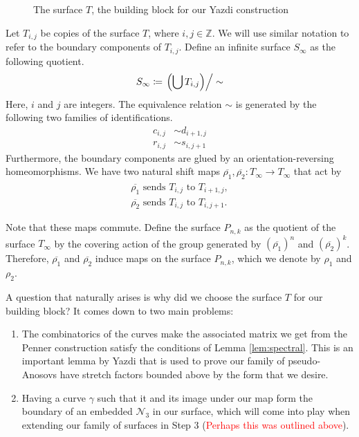 \begin{figure}[]
    \centering
    \caption{The surface $T$, the building block for our Yazdi construction}
    \label{fig:buildingblock}
\end{figure}

Let $T_{i,j}$ be copies of the surface $T$, where $i,j \in \mathbb{Z}$. We will use similar notation to refer
to the boundary components of $T_{i,j}$. Define an infinite surface $S_\infty$ as the following quotient.
\begin{align*}
  S_\infty \coloneqq \left. \left( \bigcup T_{i,j} \right)\right/\sim
\end{align*}
Here, $i$ and $j$ are integers. The equivalence relation $\sim$ is generated by the following two families of identifications.
\begin{align*}
  c_{i,j} &\sim d_{i+1,j} \\
  r_{i,j} &\sim s_{i,j+1}
\end{align*}
Furthermore, the boundary components are glued by an orientation-reversing homeomorphisms.
We have two natural shift maps $\overline{\rho_1},\overline{\rho_2}: T_\infty \xrightarrow[]{} T_\infty$ that act by
\begin{gather*}
    \overline{\rho_1} \text{ sends } T_{i,j} \text{ to } T_{i+1,j}, \\
    \overline{\rho_2} \text{ sends } T_{i,j} \text{ to } T_{i,j+1}.
\end{gather*}

Note that these maps commute. Define the surface $P_{n,k}$ as the quotient of the surface $T_\infty$ by the covering action of the group generated by $(\overline{\rho_1})^n$ and $(\overline{\rho_2})^k$. Therefore, $\overline{\rho_1}$ and $\overline{\rho_2}$ induce maps on the surface $P_{n,k}$, which we denote by $\rho_1$ and $\rho_2$.

A question that naturally arises is why did we choose the surface $T$ for our building block? It comes down to two main problems:
\begin{enumerate}
    \item The combinatorics of the curves make the associated matrix we get from the Penner construction satisfy the conditions of Lemma \ref{lem:spectral}. This is an important lemma by Yazdi that is used to prove our family of pseudo-Anosovs have stretch factors bounded above by the form that we desire.
    \item Having a curve $\gamma$ such that it and its image under our map form the boundary of an embedded $\mathcal{N}_3$ in our surface, which will come into play when extending our family of surfaces in Step 3 (\textcolor{red}{Perhaps this was outlined above}).
\end{enumerate}

